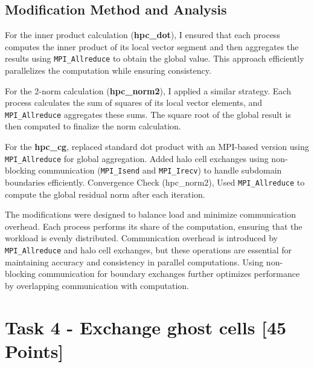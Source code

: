\documentclass[unicode,11pt,a4paper,oneside,numbers=endperiod,openany]{scrartcl}
\begin{document}
\subsection{Modification Method and Analysis}

For the inner product calculation (\textbf{hpc\_dot}), I ensured that each process computes the inner product of its local vector segment and then aggregates the results using \texttt{MPI\_Allreduce} to obtain the global value. This approach efficiently parallelizes the computation while ensuring consistency.

For the 2-norm calculation (\textbf{hpc\_norm2}), I applied a similar strategy. Each process calculates the sum of squares of its local vector elements, and \texttt{MPI\_Allreduce} aggregates these sums. The square root of the global result is then computed to finalize the norm calculation.

For the \textbf{hpc\_cg}, replaced standard dot product with an MPI-based version using \texttt{MPI\_Allreduce} for global aggregation. Added halo cell exchanges using non-blocking communication (\texttt{MPI\_Isend} and \texttt{MPI\_Irecv}) to handle subdomain boundaries efficiently. Convergence Check (hpc\_norm2), Used \texttt{MPI\_Allreduce} to compute the global residual norm after each iteration.

The modifications were designed to balance load and minimize communication overhead. Each process performs its share of the computation, ensuring that the workload is evenly distributed. Communication overhead is introduced by \texttt{MPI\_Allreduce} and halo cell exchanges, but these operations are essential for maintaining accuracy and consistency in parallel computations. Using non-blocking communication for boundary exchanges further optimizes performance by overlapping communication with computation.

\section{Task 4 - Exchange ghost cells [45 Points] }
\end{document}
